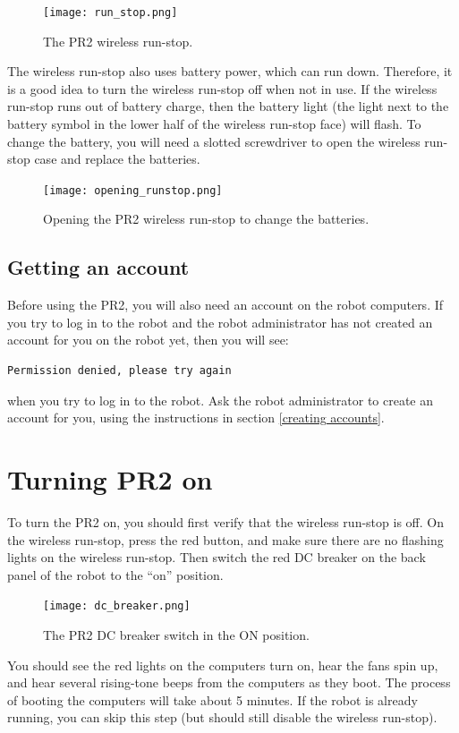 \begin{figure}[h]
\centering
\texttt{[image: run\_stop.png]}
\caption{The PR2 wireless run-stop.}
\label{fig:runstop}
\end{figure}

The wireless run-stop also uses battery power, which can run down. Therefore, it is a good idea to turn the wireless run-stop off when not in use. If the wireless run-stop runs out of battery charge, then the battery light (the light next to the battery symbol in the lower half of the wireless run-stop face) will flash. To change the battery, you will need a slotted screwdriver to open the wireless run-stop case and replace the batteries.

\begin{figure}[!h]
\centering
\texttt{[image: opening\_runstop.png]}
\caption{Opening the PR2 wireless run-stop to change the batteries.}
\label{fig:opening-runstop}
\end{figure}

\subsection{Getting an account}
Before using the PR2, you will also need an account on the robot computers.  If you try to log in to the robot and the 
robot administrator has not created an account for you on the robot yet, then you will see:
\begin{verbatim}
Permission denied, please try again
\end{verbatim}
when you try to log in to the robot. Ask the robot administrator to create an account for you, using the instructions 
in section \ref{creating accounts}.
\section{Turning PR2 on}
To turn the PR2 on, you should first verify that the wireless run-stop is off. On the wireless run-stop, press the 
red button, and make sure there are no flashing lights on the wireless run-stop. Then switch the red DC breaker on 
the back panel of the robot to the ``on'' position.  

\begin{figure}[h]
\centering
\texttt{[image: dc\_breaker.png]}
\caption{The PR2 DC breaker switch in the ON position.}
\label{fig:dc_breaker}
\end{figure}

You should see the red lights on the computers turn on, hear the fans spin up, and hear several rising-tone beeps from the computers 
as they boot.  The process of booting the computers will take about 5 minutes.  If the robot is already running, you can 
skip this step (but should still disable the wireless run-stop).
